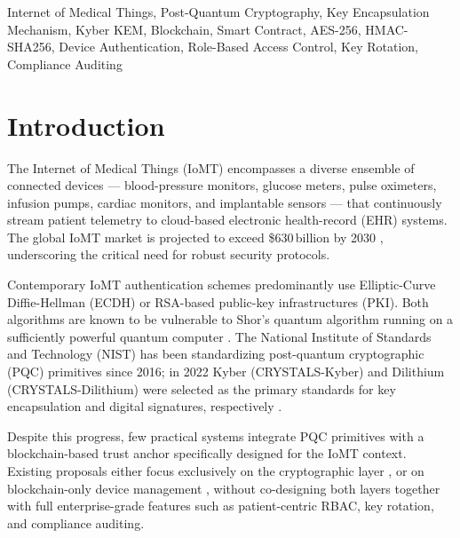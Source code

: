 \documentclass[conference]{IEEEtran}
\begin{document}
\begin{IEEEkeywords}
Internet of Medical Things, Post-Quantum Cryptography, Key Encapsulation Mechanism,
Kyber KEM, Blockchain, Smart Contract, AES-256, HMAC-SHA256, Device Authentication,
Role-Based Access Control, Key Rotation, Compliance Auditing
\end{IEEEkeywords}

\section{Introduction}

The Internet of Medical Things (IoMT) encompasses a diverse ensemble of connected
devices — blood-pressure monitors, glucose meters, pulse oximeters, infusion pumps,
cardiac monitors, and implantable sensors — that continuously stream patient telemetry
to cloud-based electronic health-record (EHR) systems. The global IoMT market is
projected to exceed \$630\,billion by 2030 \cite{iomt_market}, underscoring the
critical need for robust security protocols.

Contemporary IoMT authentication schemes predominantly use Elliptic-Curve
Diffie-Hellman (ECDH) or RSA-based public-key infrastructures (PKI). Both algorithms
are known to be vulnerable to Shor's quantum algorithm running on a sufficiently
powerful quantum computer \cite{shor1994}. The National Institute of Standards and
Technology (NIST) has been standardizing post-quantum cryptographic (PQC) primitives
since 2016; in 2022 Kyber (CRYSTALS-Kyber) and Dilithium (CRYSTALS-Dilithium) were
selected as the primary standards for key encapsulation and digital signatures,
respectively \cite{nist_pqc}.

Despite this progress, few practical systems integrate PQC primitives with a
blockchain-based trust anchor specifically designed for the IoMT context. Existing
proposals either focus exclusively on the cryptographic layer
\cite{pq_iot_auth,kyber_iot}, or on blockchain-only device management
\cite{blockchain_iomt}, without co-designing both layers together with full
enterprise-grade features such as patient-centric RBAC, key rotation, and compliance
auditing.
\end{document}
